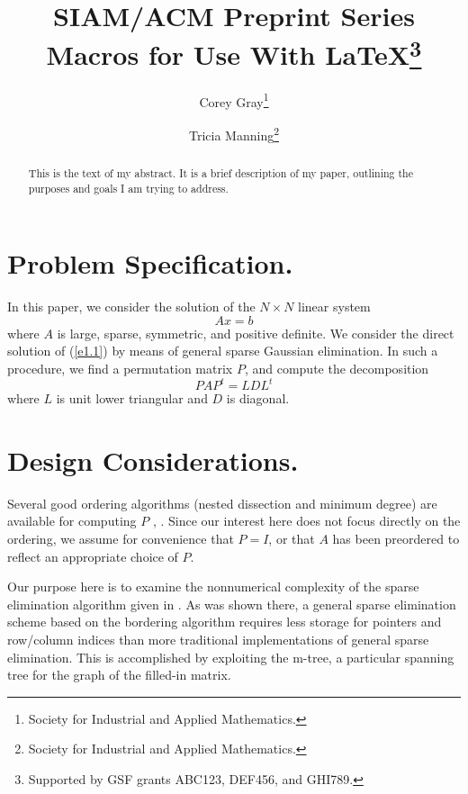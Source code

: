 \documentclass[twoside,leqno,twocolumn]{article}
\begin{document}

\title{\Large SIAM/ACM Preprint Series Macros for
Use With LaTeX\thanks{Supported by GSF grants ABC123, DEF456, and GHI789.}}
\author{Corey Gray\thanks{Society for Industrial and Applied Mathematics.} \\
\and 
Tricia Manning\thanks{Society for Industrial and Applied Mathematics.}}
\date{}

\maketitle

 

\begin{abstract} \small\baselineskip=9pt This is the text of my abstract. It is a brief
description of my
paper, outlining the purposes and goals I am trying to address.\end{abstract}

 


\section{Problem Specification.}In this paper, we consider the solution of the $N \times
N$ linear
system
\begin{equation} \label{e1.1}
A x = b
\end{equation}
where $A$ is large, sparse, symmetric, and positive definite.  We consider
the direct solution of (\ref{e1.1}) by means of general sparse Gaussian
elimination.  In such a procedure, we find a permutation matrix $P$, and
compute the decomposition
\[
P A P^{t} = L D L^{t}
\]
where $L$ is unit lower triangular and $D$ is diagonal.  

 
\section{Design Considerations.}Several good ordering algorithms (nested dissection and
minimum degree)
are available for computing $P$  \cite{GEORGELIU}, \cite{ROSE72}.
Since our interest here does not
focus directly on the ordering, we assume for convenience that $P=I$,
or that $A$ has been preordered to reflect an appropriate choice of $P$.

Our purpose here is to examine the nonnumerical complexity of the
sparse elimination algorithm given in  \cite{BANKSMITH}.
As was shown there, a general sparse elimination scheme based on the
bordering algorithm requires less storage for pointers and
row/column indices than more traditional implementations of general
sparse elimination.  This is accomplished by exploiting the m-tree,
a particular spanning tree for the graph of the filled-in matrix.
\end{document}
